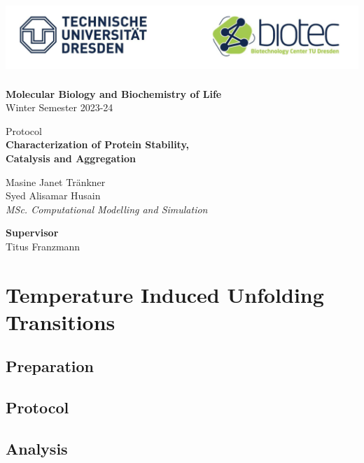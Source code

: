 \documentclass[a4paper,11pt]{article}
\begin{document}
    \begin{titlepage}
        \begin{center}
            \includegraphics[height=7.5em]{../resources/unilogo.png}
            \vspace{2em}

            {\bfseries Molecular Biology and Biochemistry of Life}\\
            Winter Semester 2023-24
            \vspace{4em}

            {\Large Protocol} \\ 
            {\LARGE\bfseries Characterization of Protein Stability,\\ Catalysis and Aggregation}
            \vspace{10em}

            Masine Janet Tränkner\\
            Syed Alisamar Husain\\
            {\it MSc. Computational Modelling and Simulation}
            \vspace{5em}

            {\bfseries Supervisor} \\ Titus Franzmann
        \end{center}
    \end{titlepage}
    \pagebreak

    \tableofcontents
    \listoffigures
    \pagebreak

    \section{Temperature Induced Unfolding Transitions}
        \subsection{Preparation}
        \lipsum[1]
        \subsection{Protocol}
        \lipsum[1]
        \subsection{Analysis}
        \lipsum[1]
    \pagebreak
    
\end{document}
